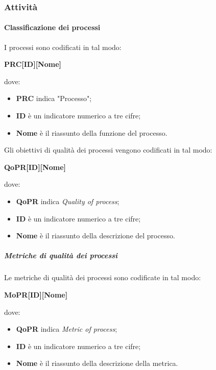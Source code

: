 \documentclass[../norme-di-progetto.tex]{subfiles}
\begin{document}
\subsubsection{Attività}
\paragraph{Classificazione dei processi}
I processi sono codificati in tal modo: \\
\begin{center}
  \centering
  \textbf{PRC[ID][Nome]}
\end{center} dove:
\begin{itemize}
  \item \textbf{PRC} indica "Processo";
  \item \textbf{ID} è un indicatore numerico a tre cifre;
  \item \textbf{Nome} è il riassunto della funzione del processo.
\end{itemize}

Gli obiettivi di qualità dei processi vengono codificati in tal modo: \\
\begin{center}
  \centering
  \textbf{QoPR[ID][Nome]}
\end{center} dove:
\begin{itemize}
  \item \textbf{QoPR} indica \textit{Quality of process};
  \item \textbf{ID} è un indicatore numerico a tre cifre;
  \item \textbf{Nome} è il riassunto della descrizione del processo.
\end{itemize}

\subparagraph{Metriche di qualità dei processi}
Le metriche di qualità dei processi sono codificate in tal modo: \\
\begin{center}
  \centering
  \textbf{MoPR[ID][Nome]}
\end{center} dove:
\begin{itemize}
  \item \textbf{QoPR} indica \textit{Metric of process};
  \item \textbf{ID} è un indicatore numerico a tre cifre;
  \item \textbf{Nome} è il riassunto della descrizione della metrica.
\end{itemize}
\end{document}
